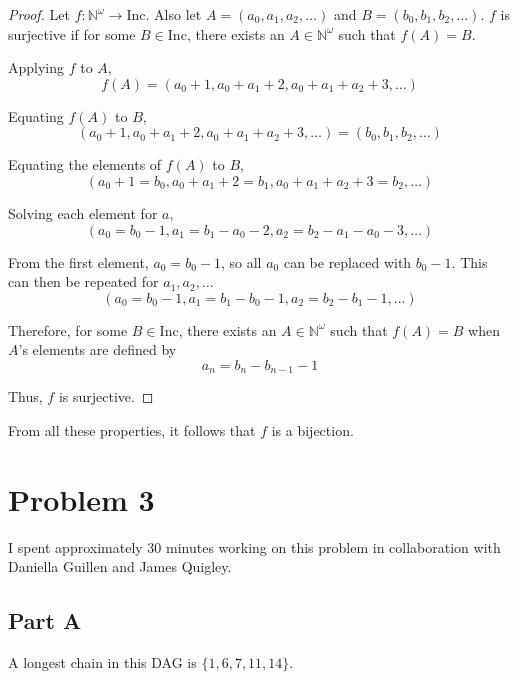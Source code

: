 \documentclass{article}
\begin{document}
\begin{proof}
  Let $f: \mathbb{N}^{\omega} \rightarrow \mathrm{Inc}$. Also let $A = (a_{0},
  a_{1}, a_{2}, \ldots)$ and $B = (b_{0}, b_{1}, b_{2}, \ldots)$. $f$ is
  surjective if for some $B \in \mathrm{Inc}$, there exists an $A \in
  \mathbb{N}^{\omega}$ such that $f(A) = B$.

  \bigbreak

  Applying $f$ to $A$,
  $$ f(A) = (a_{0} + 1, a_{0} + a_{1} + 2, a_{0} + a_{1} + a_{2} + 3, \ldots) $$

  Equating $f(A)$ to $B$,
  $$ (a_{0} + 1, a_{0} + a_{1} + 2, a_{0} + a_{1} + a_{2} + 3, \ldots) = (b_{0},
  b_{1}, b_{2}, \ldots) $$

  Equating the elements of $f(A)$ to $B$,
  $$ (a_{0} + 1 = b_{0}, a_{0} + a_{1} + 2 = b_{1}, a_{0} + a_{1} + a_{2} + 3 =
  b_{2}, \ldots) $$

  Solving each element for $a$,
  $$ (a_{0} = b_{0} - 1, a_{1} = b_{1} - a_{0} - 2, a_{2} = b_{2} - a_{1} -
  a_{0} - 3, \ldots) $$

  From the first element, $a_{0} = b_{0} - 1$, so all $a_{0}$ can be replaced
  with $b_{0} - 1$. This can then be repeated for $a_{1}, a_{2}, \ldots$
  $$ (a_{0} = b_{0} - 1, a_{1} = b_{1} - b_{0} - 1, a_{2} = b_{2} - b_{1} - 1, \ldots) $$

  Therefore, for some $B \in \mathrm{Inc}$, there exists an $A \in
  \mathbb{N}^{\omega}$ such that $f(A) = B$ when $A$'s elements are defined by
  $$ a_{n} = b_{n} - b_{n-1} - 1 $$

  Thus, $f$ is surjective.

\end{proof}

From all these properties, it follows that $f$ is a bijection.

\break

\section*{Problem 3}

I spent approximately 30 minutes working on this problem in collaboration with
Daniella Guillen and James Quigley.

\subsection*{Part A}

A longest chain in this DAG is $\{1, 6, 7, 11, 14\}$.
\end{document}
